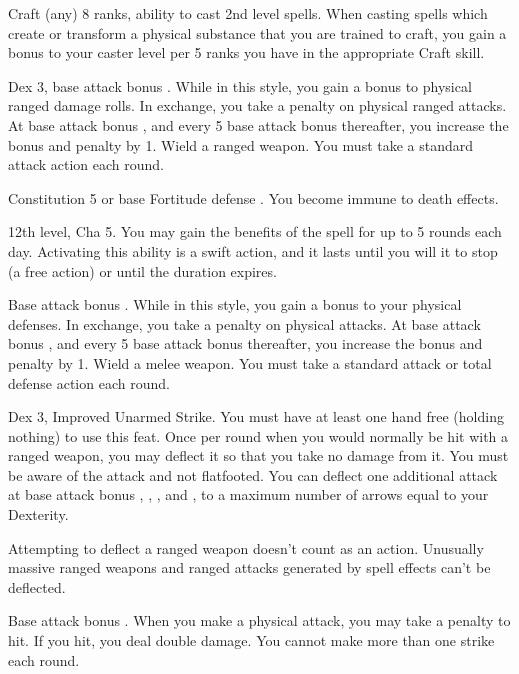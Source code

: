 \featpres Craft (any) 8 ranks, ability to cast 2nd level spells.
\featben When casting spells which create or transform a physical substance that you are trained to craft, you gain a  bonus to your caster level per 5 ranks you have in the appropriate Craft skill.

 Dex 3, base attack bonus .
 While in this style, you gain a  bonus to physical ranged damage rolls. In exchange, you take a  penalty on physical ranged attacks. At base attack bonus , and every 5 base attack bonus thereafter, you increase the bonus and penalty by 1.
\stylereq Wield a ranged weapon. You must take a standard attack action each round.

\featpre Constitution 5 or base Fortitude defense .
\featben You become immune to death effects.

\featpre 12th level, Cha 5.
\featben You may gain the benefits of the  spell for up to 5 rounds each day. Activating this ability is a swift action, and it lasts until you will it to stop (a free action) or until the duration expires.

\featpre Base attack bonus .
 While in this style, you gain a  bonus to your physical defenses. In exchange, you take a  penalty on physical attacks. At base attack bonus , and every 5 base attack bonus thereafter, you increase the bonus and penalty by 1.
\stylereq Wield a melee weapon. You must take a standard attack or total defense action each round.

 Dex 3, Improved Unarmed Strike.
 You must have at least one hand free (holding nothing) to use this feat. Once per round when you would normally be hit with a ranged weapon, you may deflect it so that you take no damage from it. You must be aware of the attack and not flatfooted. You can deflect one additional attack at base attack bonus , , , and , to a maximum number of arrows equal to your Dexterity.
\par Attempting to deflect a ranged weapon doesn't count as an action. Unusually massive ranged weapons and ranged attacks generated by spell effects can't be deflected.

\featpre Base attack bonus .
\featben When you make a physical attack, you may take a  penalty to hit. If you hit, you deal double damage. You cannot make more than one strike each round.

